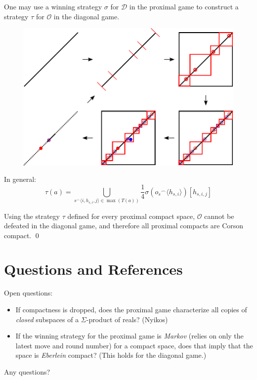 \documentclass{beamer}
\theoremstyle{definition}
\newcommand{\concat}{{^\frown}}
\newcommand{\<}{\langle}
\renewcommand{\>}{\rangle}
\newcommand{\pl}[1]{\mathscr{#1}}
\newcommand{\term}{\textit}
\begin{document}
\begin{frame}
  One may use a winning strategy $\sigma$ for $\pl D$ in the proximal game to
  construct a strategy $\tau$ for $\pl O$ in the diagonal game.

  \begin{figure}
    \includegraphics[width=0.7\linewidth]{convertingStrategy.pdf}
  \end{figure}
\end{frame}

\begin{frame}
  In general:
  \[
    \tau(a)
      =
    \bigcup_{s\concat\<i,h_{s,i},j\>\in\max(T(a))}
    \frac{1}{4}\sigma(o_s\concat\<h_{s,i}\>)[h_{s,i,j}]
  \]

  \vspacing

  Using the strategy $\tau$ defined for every proximal compact space,
  $\pl O$ cannot be defeated in the diagonal game, and therefore all
  proximal compacts are Corson compact. \qed
\end{frame}

\section{Questions and References}

\begin{frame}
  Open questions:

  \begin{itemize}
    \item If compactness is dropped, does the proximal game characterize
    all copies of \textit{closed} subspaces of a $\Sigma$-product of reals?
    (Nyikos)
    \item If the winning strategy for the proximal game is \term{Markov}
    (relies on only the latest move and round number) for a compact space,
    does that imply that the space is \term{Eberlein} compact?
    (This holds for the diagonal game.)
  \end{itemize}
\end{frame}


\begin{frame}[allowframebreaks]
  \tiny
  
  
\end{frame}

\begin{frame}
  Any questions?
\end{frame}
\end{document}
